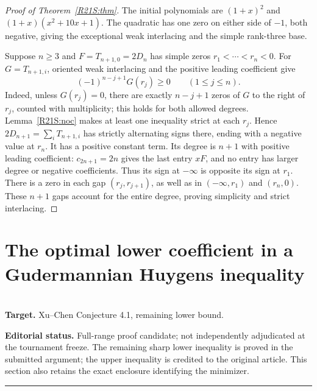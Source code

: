 \documentclass[11pt,a4paper]{article}
\begin{document}
\begin{proof}[Proof of Theorem~\ref{R21S:thm}]
The initial polynomials are $(1+x)^2$ and $(1+x)(x^2+10x+1)$. The quadratic has one zero on either side of $-1$, both negative, giving the exceptional weak interlacing and the simple rank-three base.

Suppose $n\ge3$ and $F=T_{n+1,0}=2D_n$ has simple zeros $r_1<\cdots<r_n<0$. For $G=T_{n+1,i}$, oriented weak interlacing and the positive leading coefficient give
\[
 (-1)^{n-j+1}G(r_j)\ge0\qquad(1\le j\le n).
\]
Indeed, unless $G(r_j)=0$, there are exactly $n-j+1$ zeros of $G$ to the right of $r_j$, counted with multiplicity; this holds for both allowed degrees. Lemma~\ref{R21S:noc} makes at least one inequality strict at each $r_j$. Hence $2D_{n+1}=\sum_i T_{n+1,i}$ has strictly alternating signs there, ending with a negative value at $r_n$. It has a positive constant term. Its degree is $n+1$ with positive leading coefficient: $c_{2n+1}=2n$ gives the last entry $xF$, and no entry has larger degree or negative coefficients. Thus its sign at $-\infty$ is opposite its sign at $r_1$. There is a zero in each gap $(r_j,r_{j+1})$, as well as in $(-\infty,r_1)$ and $(r_n,0)$. These $n+1$ gaps account for the entire degree, proving simplicity and strict interlacing.
\end{proof}

\small
\endgroup


\clearpage

\section{The optimal lower coefficient in a Gudermannian Huygens inequality}
\label{section:R22K}
\\[3pt]
\noindent\textbf{Target.} Xu--Chen Conjecture 4.1, remaining lower bound.

\noindent\textbf{Editorial status.} Full-range proof candidate; not independently adjudicated at the tournament freeze. The remaining sharp lower inequality is proved in the submitted argument; the upper inequality is credited to the original article. This section also retains the exact enclosure identifying the minimizer.

\smallskip\hrule\medskip



\begingroup
\newcommand{\gd}{\operatorname{gd}}
\newcommand{\sech}{\operatorname{sech}}
\setcounter{equation}{0}
\renewcommand{\theequation}{\thesection.\arabic{equation}}
\renewcommand{\theHequation}{R22K.\arabic{equation}}
\end{document}
